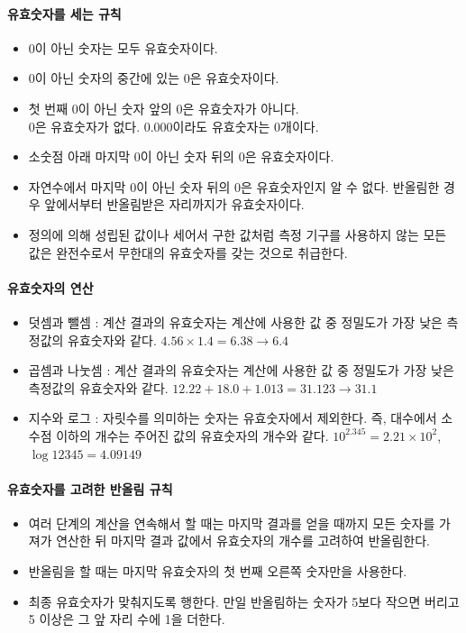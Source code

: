 \documentclass{GSHS-chemexp}
\begin{document}
	\paragraph{유효숫자를 세는 규칙}
	\begin{itemize}
		\item 0이 아닌 숫자는 모두 유효숫자이다.
		\item 0이 아닌 숫자의 중간에 있는 0은 유효숫자이다.
		\item 첫 번째 0이 아닌 숫자 앞의 0은 유효숫자가 아니다.\\
		0은 유효숫자가 없다. 0.000이라도 유효숫자는 \unit{0}{개}이다.
		\item 소숫점 아래 마지막 0이 아닌 숫자 뒤의 0은 유효숫자이다.
		\item 자연수에서 마지막 0이 아닌 숫자 뒤의 0은 유효숫자인지
		알 수 없다. 반올림한 경우 앞에서부터 반올림받은 자리까지가
		유효숫자이다.
		\item 정의에 의해 성립된 값이나 세어서 구한 값처럼
		측정 기구를 사용하지 않는 모든 값은 완전수로서
		무한대의 유효숫자를 갖는 것으로 취급한다.
	\end{itemize}
	
	\paragraph{유효숫자의 연산}
	\begin{itemize}
		\item 덧셈과 뺄셈 : 계산 결과의 유효숫자는
		계산에 사용한 값 중 정밀도가 가장 낮은 측정값의
		유효숫자와 같다.
		$4.56 \times 1.4 = 6.38 \rightarrow 6.4$
		\item 곱셈과 나눗셈 : 계산 결과의 유효숫자는
		계산에 사용한 값 중 정밀도가 가장 낮은 측정값의
		유효숫자와 같다.
		$12.22+18.0+1.013=31.123 \rightarrow 31.1$
		\item 지수와 로그 : 자릿수를 의미하는 숫자는
		유효숫자에서 제외한다. 즉, 대수에서 소수점 이하의 개수는
		주어진 값의 유효숫자의 개수와 같다.
		$10^{2.345} = 2.21 \times 10^{2}$,
		$\log 12345 = 4.09149$
	\end{itemize}
	
	\paragraph{유효숫자를 고려한 반올림 규칙}
	\begin{itemize}
		\item 여러 단계의 계산을 연속해서 할 때는
		마지막 결과를 얻을 때까지 모든 숫자를 가져가 연산한 뒤
		마지막 결과 값에서 유효숫자의 개수를 고려하여 반올림한다.
		\item 반올림을 할 때는 마지막 유효숫자의
		첫 번째 오른쪽 숫자만을 사용한다.
		\item 최종 유효숫자가 맞춰지도록 행한다.
		만일 반올림하는 숫자가 5보다 작으면 버리고
		5 이상은 그 앞 자리 수에 1을 더한다.
	\end{itemize}
	
\end{document}
